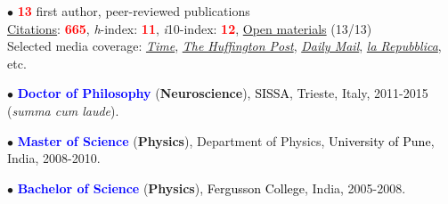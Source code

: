\documentclass[10pt]{article}
\begin{document}
	
	

	
	$\bullet$ \textbf{\textcolor{red}{13}} first author, peer-reviewed publications\\
	\hspace*{0.1in}\href{https://scholar.google.it/citations?user=kSYuYTUAAAAJ&hl=en&oi=ao}{Citations}: \textbf{\textcolor{red}{665}}, \textit{h}-index: \textbf{\textcolor{red}{11}}, \textit{i}10-index: \textbf{\textcolor{red}{12}}, \href{https://osf.io/hk5f3/}{Open materials} (13/13)\\
	\hspace*{0.1in}Selected media coverage: \href{http://time.com/3242/driving-over-your-best-friend-its-the-right-thing-to-do/}{\textit{Time}}, \href{http://www.huffingtonpost.com/entry/autism-empathy-brain-research_us_56f92575e4b014d3fe237413}{\textit{The Huffington Post}}, \href{http://www.dailymail.co.uk/sciencetech/article-4308284/Virtual-reality-experiment-puts-altruism-test.html}{\textit{Daily Mail}}, \href{http://www.repubblica.it/scienze/2017/04/11/news/area_cervello_perdono-162669836/?rss}{\textit{la Repubblica}}, etc.

	
	$\bullet$ \textbf{\textcolor{blue}{Doctor of Philosophy}} (\textbf{Neuroscience}), \textcolor{black}{SISSA}, Trieste, Italy, 2011-2015 (\textit{summa cum laude}).\\ 
	 \miniskip
	
	$\bullet$ \textbf{\textcolor{blue}{Master of Science}} (\textbf{Physics}), Department of Physics, \textcolor{black}{University of Pune}, India, 2008-2010.\\%
	\miniskip
	
	$\bullet$ \textbf{\textcolor{blue}{Bachelor of Science}} (\textbf{Physics}), \textcolor{black}{Fergusson College}, India, 2005-2008.%
\end{document}
